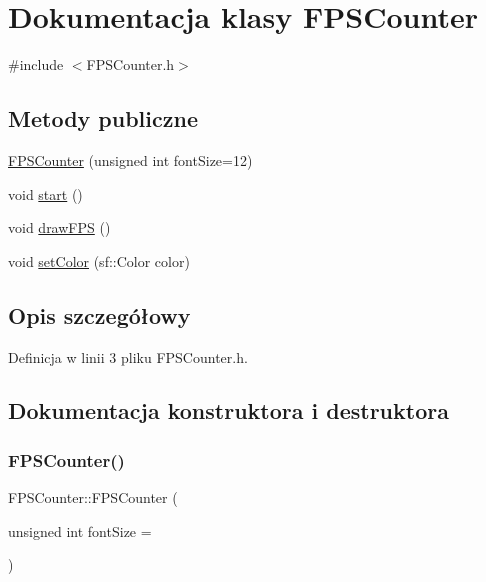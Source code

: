 \hypertarget{class_f_p_s_counter}{}\section{Dokumentacja klasy F\+P\+S\+Counter}
\label{class_f_p_s_counter}


{\ttfamily \#include $<$F\+P\+S\+Counter.\+h$>$}

\subsection*{Metody publiczne}
\begin{DoxyCompactItemize}
\item 
\mbox{\hyperlink{class_f_p_s_counter_ae565c465bd222c4f733813b402d232a8}{F\+P\+S\+Counter}} (unsigned int font\+Size=12)
\item 
void \mbox{\hyperlink{class_f_p_s_counter_abba94df2064bfa561ef9d1a3e11929a5}{start}} ()
\item 
void \mbox{\hyperlink{class_f_p_s_counter_a7415ae4bb4094b4809627caf5e40d8f1}{draw\+F\+PS}} ()
\item 
void \mbox{\hyperlink{class_f_p_s_counter_a57be5e95f140cb230f3f4e11ca476857}{set\+Color}} (sf\+::\+Color color)
\end{DoxyCompactItemize}


\subsection{Opis szczegółowy}


Definicja w linii 3 pliku F\+P\+S\+Counter.\+h.



\subsection{Dokumentacja konstruktora i destruktora}
\mbox{\label{class_f_p_s_counter_ae565c465bd222c4f733813b402d232a8}} 
\subsubsection{\texorpdfstring{F\+P\+S\+Counter()}{FPSCounter()}}
{\footnotesize\ttfamily F\+P\+S\+Counter\+::\+F\+P\+S\+Counter (\begin{DoxyParamCaption}\item[{unsigned int}]{font\+Size = {} }\end{DoxyParamCaption})}



